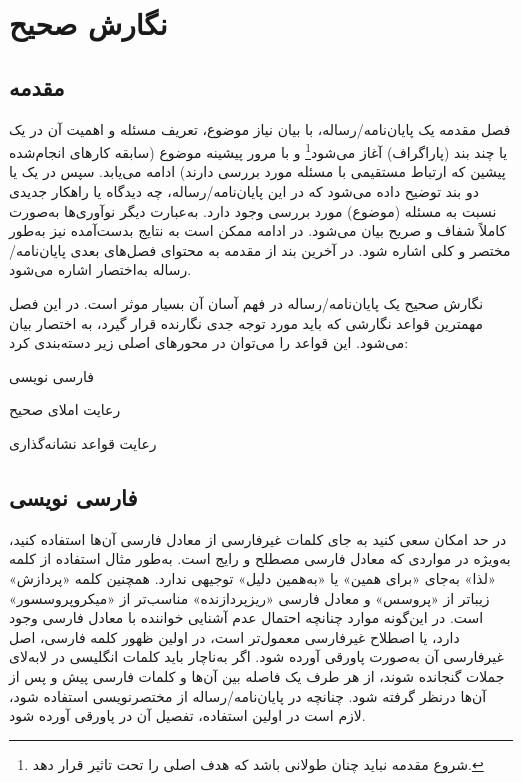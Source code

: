 \chapter{نگارش صحیح}
\section{مقدمه}

فصل مقدمه یک پایان‌نامه/رساله، با بیان نیاز موضوع، تعریف مسئله و اهمیت آن در یک یا چند بند (پاراگراف) آغاز می‌شود\footnote{شروع مقدمه نباید 
چنان طولانی باشد كه هدف اصلی را تحت‌ تاثیر قرار دهد.}  و با مرور پیشینه موضوع (سابقه کارهای انجام‌شده پیشین که ارتباط مستقیمی با مسئله مورد بررسی دارند) 
ادامه می‌یابد. سپس در یک یا دو بند توضیح داده می‌شود كه در این پایان‌نامه/رساله، چه دیدگاه یا راهكار جدیدی نسبت به مسئله (موضوع) مورد بررسی وجود دارد. 
به‌عبارت دیگر نوآوری‌ها به‌صورت کاملاً شفاف و صریح بیان می‌شود. در ادامه ممکن است به نتایج بدست‌آمده نیز به‌طور مختصر و کلی اشاره ‌شود. 
در آخرین بند از مقدمه به محتوای فصل‌های بعدی پایان‌نامه/رساله به‌اختصار اشاره می‌شود.

نگارش صحیح یک پایان‌نامه/رساله در فهم آسان آن بسیار موثر است. در این فصل مهمترین قواعد نگارشی که باید مورد توجه جدی نگارنده قرار گیرد، 
به اختصار بیان می‌شود. این قواعد را می‌توان در محورهای اصلی زیر دسته‌بندی کرد:

\begin{enumerate*}[label=\textbf{\alph*)}]
\item
فارسی نویسی
\item
رعایت املای صحیح 
\item
رعایت قواعد نشانه‌گذاری
\end{enumerate*}
\section{فارسی نویسی}
در حد امکان سعی کنید به جای کلمات غیر‌فارسی از معادل فارسی آن‌ها استفاده کنید، به‌ویژه در مواردی که معادل فارسی مصطلح و رایج است‌.‌ به‌طور مثال استفاده از کلمه «لذا» به‌جای «برای همین» یا «به‌همین دلیل» توجیهی ندارد‌. همچنین کلمه «پردازش» زیباتر از «پروسس» و معادل فارسی «ریز‌پردازنده» مناسب‌تر از «میکروپروسسور» است‌.‌ در این‌گونه موارد چنانچه احتمال عدم آشنایی خواننده با معادل فارسی وجود دارد، یا اصطلاح غیر‌فارسی معمول‌تر است، در اولین ظهور کلمه فارسی، اصل غیر‌فارسی آن به‌صورت پاورقی آورده شود‌.‌ اگر به‌ناچار باید کلمات انگلیسی در لابه‌لای جملات گنجانده شوند، از هر طرف یک فاصله بین آن‌ها و کلمات فارسی پیش و پس از آن‌ها در‌نظر گرفته شود‌.‌ چنانچه در پایان‌نامه/رساله از مختصر‌نویسی استفاده شود، لازم است در اولین استفاده، تفصیل آن در پاورقی آورده شود‌.‌ 


